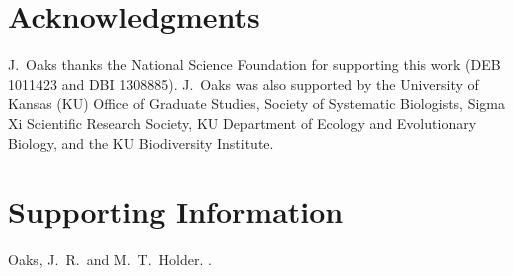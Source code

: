 \documentclass[letterpaper,12pt]{article}
\makeatletter
\let\msTitle\@title
\makeatother
\begin{document}
\newpage



\section{Acknowledgments}
J.\ Oaks thanks the National Science Foundation for supporting this work (DEB
1011423 and DBI 1308885).
J.\ Oaks was also supported by the University of Kansas (KU) Office of Graduate
Studies, Society of Systematic Biologists, Sigma Xi Scientific Research
Society, KU Department of Ecology and Evolutionary Biology, and the KU
Biodiversity Institute.



\newpage
\singlespacing

\renewcommand\listfigurename{Figure Captions}
\renewcommand\cftdotsep{\cftnodots}
\setlength\cftbeforefigskip{10pt}
\listoffigures



\newpage
\singlespacing



\clearpage

\newpage



\setcounter{figure}{0}
\setcounter{table}{0}
\setcounter{page}{1}
\setcounter{section}{0}

\singlespacing

\section*{Supporting Information}
\hangindent=1cm
Oaks, J.~R.\ and M.~T.\ Holder. \msTitle.

\newpage
\singlespacing


\end{document}

